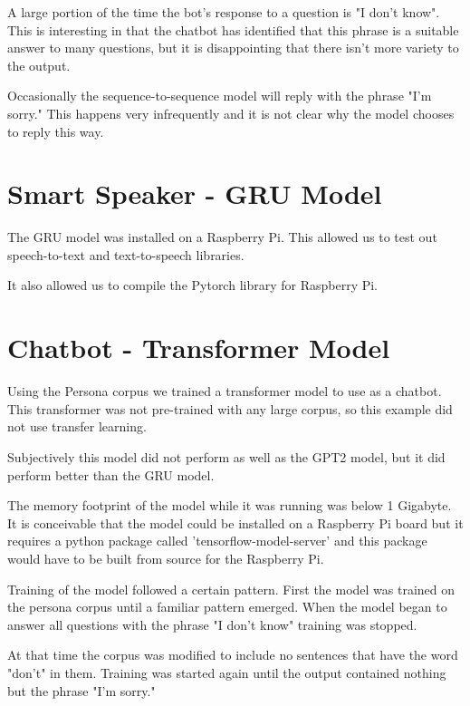 A large portion of the time the bot's 
response to a question is "I don't know". This is interesting in that the chatbot has identified that this phrase is a suitable answer to many questions, but it is disappointing that there isn't more variety to the output.  

Occasionally the sequence-to-sequence model will reply with the phrase "I'm sorry." This happens
very infrequently and it is not clear why the model chooses to reply this way. 

\section{Smart Speaker - GRU Model}

The GRU model was installed on a Raspberry Pi. This allowed us to test out speech-to-text and 
text-to-speech libraries. 

It also allowed us to compile the Pytorch library for Raspberry Pi.



\section{Chatbot - Transformer Model}
Using the Persona corpus we trained a transformer model to use as a chatbot. This transformer was not pre-trained with any large corpus, so this example did not use transfer learning. 

Subjectively this model did not perform as well as the GPT2 model, but it did perform better than the GRU model.

The memory footprint of the model while it was running was below 1 Gigabyte. It is conceivable that the model could be installed on a Raspberry Pi board but it requires a python package called 'tensorflow-model-server' and this package would have to be built from source for the Raspberry Pi. 

Training of the model followed a certain pattern. First the model was trained on the persona corpus until a familiar pattern emerged. When the model began to answer all questions with the 
phrase "I don't know" training was stopped. 

At that time the corpus was modified to include no 
sentences that have the word "don't" in them. Training was started again until the output contained nothing but the phrase "I'm sorry." 

